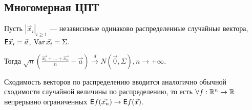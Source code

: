 \subsection{Многомерная ЦПТ}
    \begin{theorem}
    	Пусть $|\vec x_i|_{i \geqslant 1}$ --- независимые одинаково распределенные случайные вектора, $\mathsf{E}\vec x_i = \vec{a}$, $\operatorname{Var} \vec{x_i} = \Sigma$.
    	
    	Тогда $\sqrt{n} \left(\frac{\vec{x_1} + \ldots + \vec{x_n}}{n} - \vec{a} \right) \xrightarrow{d} N(\vec{0}, \Sigma), n \rightarrow +\infty$.
    \end{theorem}
    
\begin{note}
	Сходимость векторов по распределению вводится аналогично обычной сходимости случайной величины по распределению, то есть $\forall f: \mathbb{R}^n \rightarrow \mathbb{R}$ непрерывно ограниченных $\mathsf{E} f(\vec{x_n}) \rightarrow \mathsf{E} f(\vec{x})$.
\end{note}
